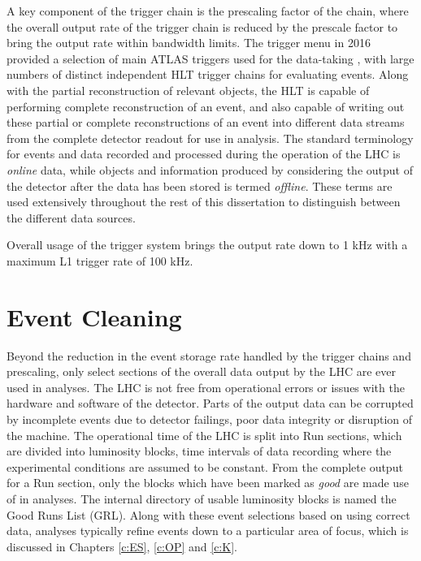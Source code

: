 	A key component of the trigger chain is the prescaling factor of the chain, where the overall output rate of the trigger chain is reduced by the prescale factor to bring the output rate within bandwidth limits. The trigger menu in 2016 provided a selection of main ATLAS triggers used for the data-taking \cite{triggermenu}, with large numbers of distinct independent HLT trigger chains for evaluating events. Along with the partial reconstruction of relevant objects, the HLT is capable of performing complete reconstruction of an event, and also capable of writing out these partial or complete reconstructions of an event into different data streams from the complete detector readout for use in analysis. The standard terminology for events and data recorded and processed during the operation of the LHC is \textit{online} data, while objects and information produced by considering the output of the detector after the data has been stored is termed \textit{offline}. These terms are used extensively throughout the rest of this dissertation to distinguish between the different data sources.

	Overall usage of the trigger system brings the output rate down to 1 kHz with a maximum L1 trigger rate of 100 kHz.

\section{Event Cleaning}

	Beyond the reduction in the event storage rate handled by the trigger chains and prescaling, only select sections of the overall data output by the LHC are ever used in analyses. The LHC is not free from operational errors or issues with the hardware and software of the detector. Parts of the output data can be corrupted by incomplete events due to detector failings, poor data integrity or disruption of the machine. The operational time of the LHC is split into Run sections, which are divided into luminosity blocks, time intervals of data recording where the experimental conditions are assumed to be constant. From the complete output for a Run section, only the blocks which have been marked as \textit{good} are made use of in analyses. The internal directory of usable luminosity blocks is named the Good Runs List (GRL). Along with these event selections based on using correct data, analyses typically refine events down to a particular area of focus, which is discussed in Chapters \ref{c:ES}, \ref{c:OP} and \ref{c:K}.


